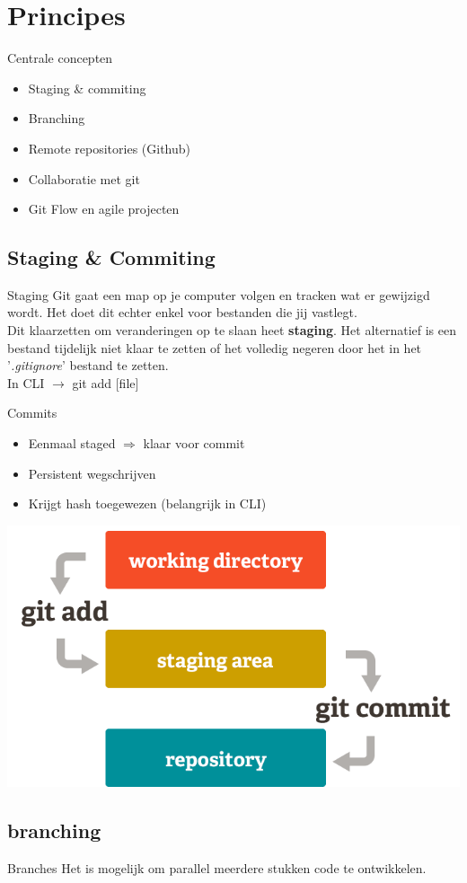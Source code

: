 \documentclass[11pt]{beamer}
\begin{document}
\section{Principes}
\begin{frame}{Centrale concepten}
\begin{itemize}
\item Staging \& commiting
\item Branching
\item Remote repositories (Github)
\item Collaboratie met git
\item Git Flow en agile projecten
\end{itemize}
\end{frame}

\subsection{Staging \& Commiting}
\begin{frame}{Staging}
Git gaat een map op je computer volgen en tracken wat er gewijzigd wordt. Het doet dit echter enkel voor bestanden die jij vastlegt.\\
\vspace{8pt}
Dit klaarzetten om veranderingen op te slaan heet \textbf{staging}. Het alternatief is een bestand tijdelijk niet klaar te zetten of het volledig negeren door het in het '\textit{.gitignore}' bestand te zetten.\\
\vspace{8pt}
In CLI $\rightarrow$ git add [file]
\end{frame}

\begin{frame}{Commits}
\begin{itemize}
\item Eenmaal staged $\Rightarrow$ klaar voor commit
\item Persistent wegschrijven
\item Krijgt hash toegewezen (belangrijk in CLI)
\end{itemize}
\center
\includegraphics[scale=.25]{git_staging_commit.png}
\end{frame}

\subsection{branching}
\begin{frame}{Branches}
Het is mogelijk om parallel meerdere stukken code te ontwikkelen.
\end{frame}
\end{document}
